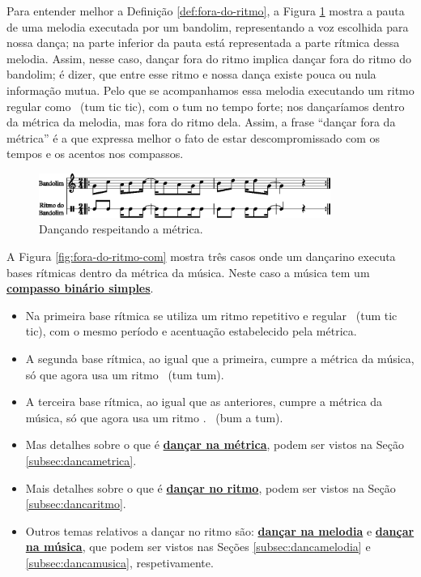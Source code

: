 Para entender melhor a Definição \ref{def:fora-do-ritmo}, a 
Figura \ref{fig:fora-do-ritmo-0-1} mostra a pauta de uma melodia executada por um bandolim, 
representando a voz escolhida para nossa dança; 
na parte inferior da pauta está representada a parte rítmica dessa melodia.
Assim, nesse caso, dançar fora do ritmo implica dançar fora do ritmo do bandolim;
é dizer, que entre esse ritmo e nossa dança existe pouca ou nula informação mutua.
Pelo que se acompanhamos essa melodia executando um ritmo regular como 
\Vier \Acht \Acht~(tum tic tic), com o tum no tempo forte;
nos dançaríamos dentro da métrica da melodia,
mas fora do ritmo dela. 
Assim, a frase ``dançar fora da métrica'' é a que expressa melhor o fato de estar descompromissado com os tempos
e os acentos nos compassos. 
\begin{figure}[!h]
    \centering 
    \includegraphics[width=0.85\textwidth]{chapters/cap-musicalidade/fora-do-ritmo-0-1.eps}
    \caption{Dançando respeitando a métrica.}
    \label{fig:fora-do-ritmo-0-1}
\end{figure}

\begin{example}
A Figura \ref{fig:fora-do-ritmo-com} mostra três casos onde um dançarino
executa bases rítmicas dentro da métrica da música. 
Neste caso a música  tem um \hyperref[subsec:compassobinario]{\textbf{compasso binário simples}}.
\begin{itemize}
\item Na primeira base rítmica se utiliza um ritmo repetitivo e regular \Vier \Acht \Acht~(tum tic tic),
com o mesmo período e acentuação estabelecido pela métrica. 
\item A segunda base rítmica, ao igual que a primeira, cumpre a métrica da música,
só que agora usa um ritmo \Vier \Vier~(tum tum).
\item A terceira base rítmica, ao igual que as anteriores, cumpre a métrica da música,
só que agora usa um ritmo \Acht. \Sech \Vier~(bum a tum).
\end{itemize}
\end{example}

\begin{tcbattention}
\begin{itemize}
\item Mas detalhes sobre o que é \hyperref[subsec:dancametrica]{\textbf{dançar na métrica}}, 
podem ser vistos na Seção \ref{subsec:dancametrica}.
\item Mais detalhes sobre o que é \hyperref[subsec:dancaritmo]{\textbf{dançar no ritmo}}, 
podem ser vistos na Seção \ref{subsec:dancaritmo}.
\item Outros temas relativos a dançar no ritmo são: 
\hyperref[subsec:dancamelodia]{\textbf{dançar na melodia}} e
\hyperref[subsec:dancamusica]{\textbf{dançar na música}},
que podem ser vistos nas Seções \ref{subsec:dancamelodia} e \ref{subsec:dancamusica},
respetivamente.
\end{itemize}
\end{tcbattention}



